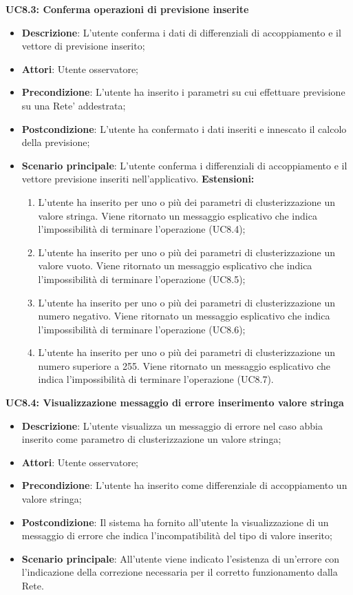 \textbf{UC8.3: Conferma operazioni di previsione inserite}\mbox{}
\label{UC8.3: Conferma operazioni di previsione inserite}
\noindent
\begin{itemize}
\item \textbf{Descrizione}: L'utente conferma i dati di differenziali di accoppiamento e il vettore di previsione inserito;
\item \textbf{Attori}: Utente osservatore;
\item \textbf{Precondizione}: L'utente ha inserito i parametri su cui effettuare previsione su una Rete' addestrata;
\item \textbf{Postcondizione}: L'utente ha confermato i dati inseriti e innescato il calcolo della previsione;
\item \textbf{Scenario principale}: L'utente conferma i differenziali di accoppiamento e il vettore previsione inseriti nell'applicativo.
\textbf{Estensioni:}
\begin{enumerate}
\item L'utente ha inserito per uno o pi\`u dei parametri di clusterizzazione un valore stringa. Viene ritornato un messaggio esplicativo che indica l'impossibilit\`a di terminare l'operazione (UC8.4);
\item L'utente ha inserito per uno o pi\`u dei parametri di clusterizzazione un valore vuoto. Viene ritornato un messaggio esplicativo che indica l'impossibilit\`a di terminare l'operazione (UC8.5);
\item L'utente ha inserito per uno o pi\`u dei parametri di clusterizzazione un numero negativo. Viene ritornato un messaggio esplicativo che indica l'impossibilit\`a di terminare l'operazione (UC8.6);
\item L'utente ha inserito per uno o pi\`u dei parametri di clusterizzazione un numero superiore a 255. Viene ritornato un messaggio esplicativo che indica l'impossibilit\`a di terminare l'operazione (UC8.7).
\end{enumerate}
\end{itemize}

\textbf{UC8.4: Visualizzazione messaggio di errore inserimento valore stringa}\mbox{}
\label{UC8.4: Visualizzazione messaggio di errore per inserimento valore stringa}
\noindent
\begin{itemize}
\item \textbf{Descrizione}: L'utente visualizza un messaggio di errore nel caso abbia inserito come parametro di clusterizzazione un valore stringa;
\item \textbf{Attori}: Utente osservatore;
\item \textbf{Precondizione}: L'utente ha inserito come differenziale di accoppiamento un valore stringa;
\item \textbf{Postcondizione}: Il sistema ha fornito all'utente la visualizzazione di un messaggio di errore che indica  l'incompatibilit\`a del tipo di valore inserito;
\item \textbf{Scenario principale}: All'utente viene indicato l'esistenza di un'errore con l'indicazione della correzione necessaria per il corretto funzionamento dalla Rete.
\end{itemize}

